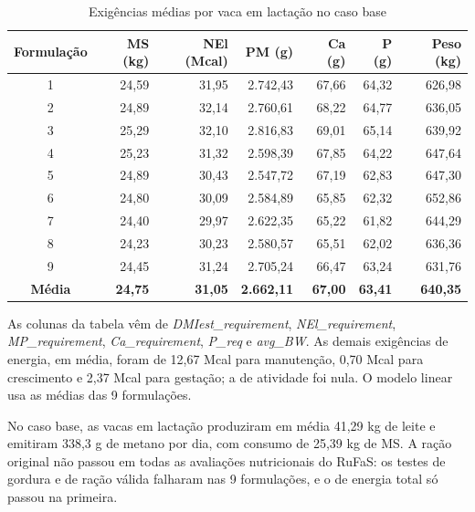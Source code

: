 \documentclass[a4paper,12pt]{article}
\begin{document}
\begin{table}[htbp]
    \centering
    \caption{Exigências médias por vaca em lactação no caso base}
    \label{tab:exigencias}
    \begin{tabular}{crrrrrr}
        \toprule
        \textbf{Formulação} & \textbf{MS (kg)} & \textbf{NEl (Mcal)} & \textbf{PM (g)} & \textbf{Ca (g)} & \textbf{P (g)} & \textbf{Peso (kg)} \\
        \midrule
        \rowcolor{gray!15}
        1 & 24,59 & 31,95 & 2.742,43 & 67,66 & 64,32 & 626,98 \\
        2 & 24,89 & 32,14 & 2.760,61 & 68,22 & 64,77 & 636,05 \\
        \rowcolor{gray!15}
        3 & 25,29 & 32,10 & 2.816,83 & 69,01 & 65,14 & 639,92 \\
        4 & 25,23 & 31,32 & 2.598,39 & 67,85 & 64,22 & 647,64 \\
        \rowcolor{gray!15}
        5 & 24,89 & 30,43 & 2.547,72 & 67,19 & 62,83 & 647,30 \\
        6 & 24,80 & 30,09 & 2.584,89 & 65,85 & 62,32 & 652,86 \\
        \rowcolor{gray!15}
        7 & 24,40 & 29,97 & 2.622,35 & 65,22 & 61,82 & 644,29 \\
        8 & 24,23 & 30,23 & 2.580,57 & 65,51 & 62,02 & 636,36 \\
        \rowcolor{gray!15}
        9 & 24,45 & 31,24 & 2.705,24 & 66,47 & 63,24 & 631,76 \\
        \midrule
        \textbf{Média} & \textbf{24,75} & \textbf{31,05} & \textbf{2.662,11} & \textbf{67,00} & \textbf{63,41} & \textbf{640,35} \\
        \bottomrule
    \end{tabular}
\end{table}

As colunas da tabela vêm de \textit{DMIest\_requirement}, \textit{NEl\_requirement}, \textit{MP\_requirement}, \textit{Ca\_requirement}, \textit{P\_req} e \textit{avg\_BW}. As demais exigências de energia, em média, foram de 12,67 Mcal para manutenção, 0,70 Mcal para crescimento e 2,37 Mcal para gestação; a de atividade foi nula. O modelo linear usa as médias das 9 formulações.

No caso base, as vacas em lactação produziram em média 41,29 kg de leite e emitiram 338,3 g de metano por dia, com consumo de 25,39 kg de MS. A ração original não passou em todas as avaliações nutricionais do RuFaS: os testes de gordura e de ração válida falharam nas 9 formulações, e o de energia total só passou na primeira.
\end{document}
